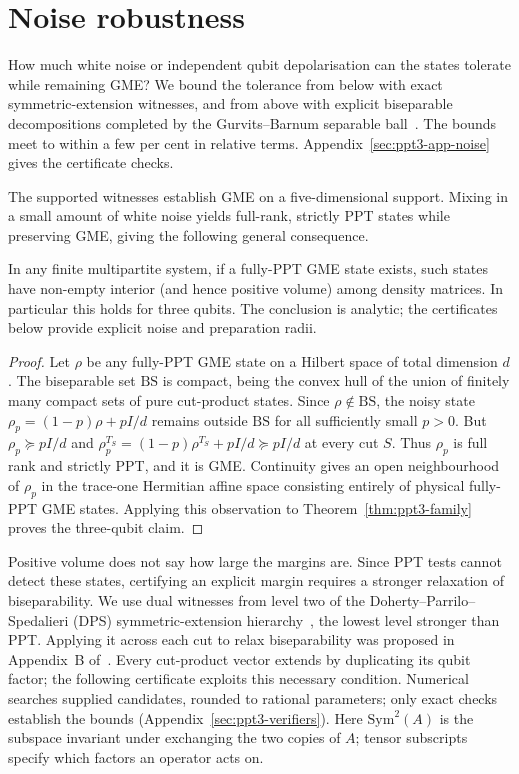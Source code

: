 \section{Noise robustness}\label{sec:ppt3-noise}

How much white noise or independent qubit depolarisation can the states tolerate while remaining GME?
We bound the tolerance from below with exact symmetric-extension witnesses, and from above with explicit biseparable
decompositions completed by the Gurvits--Barnum separable ball~\cite{GB}. The bounds meet to within a few per cent in
relative terms. Appendix~\ref{sec:ppt3-app-noise} gives the certificate checks.

The supported witnesses establish GME on a five-dimensional support.
Mixing in a small amount of white noise yields full-rank, strictly PPT
states while preserving GME, giving the following general consequence.

\begin{corollary}\label{cor:ppt3-volume}
In any finite multipartite system, if a fully-PPT GME state
exists, such states have non-empty interior (and hence positive
volume) among density matrices. In particular this holds for
three qubits. The conclusion is analytic; the certificates below
provide explicit noise and preparation radii.
\end{corollary}
\begin{proof}
Let $\rho$ be any fully-PPT GME state on a Hilbert space of total
dimension $d$. The biseparable set $\mathrm{BS}$ is compact, being the
convex hull of the union of finitely many compact sets of pure
cut-product states. Since $\rho\notin\mathrm{BS}$, the noisy state
$\rho_p=(1-p)\rho+pI/d$ remains outside $\mathrm{BS}$ for all
sufficiently small $p>0$. But $\rho_p\succeq pI/d$ and
$\rho_p^{T_S}=(1-p)\rho^{T_S}+pI/d\succeq pI/d$ at every cut $S$.
Thus $\rho_p$ is full rank and strictly PPT, and it is GME.
Continuity gives an open neighbourhood of $\rho_p$ in the trace-one
Hermitian affine space consisting entirely of physical fully-PPT GME
states. Applying this observation to Theorem~\ref{thm:ppt3-family}
proves the three-qubit claim.
\end{proof}

Positive volume does not say how large the margins are. Since PPT tests cannot detect these states, certifying an
explicit margin requires a stronger relaxation of biseparability. We use dual witnesses
from level two of the Doherty--Parrilo--Spedalieri (DPS) symmetric-extension hierarchy~\cite{DPS02,DPS,DPS05}, the lowest level
stronger than PPT. Applying it across each cut to relax biseparability was proposed in Appendix~B of~\cite{JMG}.
Every cut-product vector extends by duplicating its qubit factor; the following certificate exploits this necessary
condition. Numerical searches supplied candidates, rounded to rational parameters; only exact checks establish the
bounds (Appendix~\ref{sec:ppt3-verifiers}).
Here $\mathrm{Sym}^2(A)$ is the subspace invariant under exchanging the two copies of $A$; tensor subscripts specify
which factors an operator acts on.

